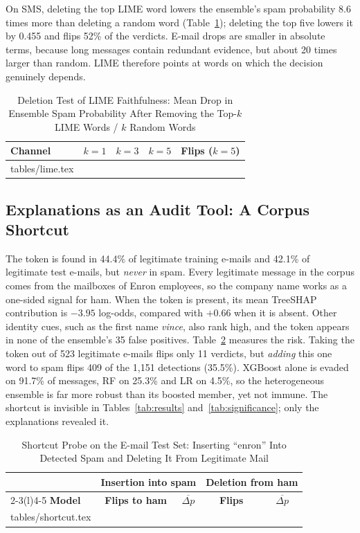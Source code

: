 \documentclass[conference]{IEEEtran}
\makeatletter
\newcommand{\inputtable}[1]{\@@input #1 }
\newcommand{\tok}[1]{\texttt{\detokenize{#1}}}
\makeatother
\begin{document}
On SMS, deleting the top LIME word lowers the ensemble's spam probability 8.6
times more than deleting a random word (Table~\ref{tab:lime}); deleting the
top five lowers it by 0.455 and flips 52\% of the verdicts. E-mail drops are
smaller in absolute terms, because long messages contain redundant evidence,
but about 20 times larger than random. LIME therefore points at words on
which the decision genuinely depends.

\begin{table}[!t]
\caption{Deletion Test of LIME Faithfulness: Mean Drop in Ensemble Spam Probability After Removing the Top-$k$ LIME Words / $k$ Random Words}
\label{tab:lime}
\centering
\footnotesize
\setlength{\tabcolsep}{2.4pt}
\begin{tabular}{@{}lcccc@{}}
\toprule
\textbf{Channel} & $k=1$ & $k=3$ & $k=5$ & \textbf{Flips} ($k{=}5$) \\
\midrule
\inputtable{tables/lime.tex}
\bottomrule
\end{tabular}
\end{table}

\subsection{Explanations as an Audit Tool: A Corpus Shortcut}

The token \tok{enron} is found in 44.4\% of legitimate training e-mails and
42.1\% of legitimate test e-mails, but \emph{never} in spam. Every legitimate message in the corpus comes from the mailboxes of Enron
employees, so the company name works as a
one-sided signal for ham. When the token is present, its mean TreeSHAP
contribution is $-3.95$ log-odds, compared with $+0.66$ when it is absent.
Other identity cues, such as the first name \emph{vince}, also rank high, and
the token appears in none of the ensemble's 35 false positives.
Table~\ref{tab:shortcut} measures the risk. Taking the token out of 523
legitimate e-mails flips only 11 verdicts, but \emph{adding} this one word to
spam flips 409 of the 1,151 detections (35.5\%).
XGBoost alone is evaded on
91.7\% of messages, RF on 25.3\% and LR on 4.5\%, so the heterogeneous ensemble
is far more robust than its boosted member, yet not immune. The shortcut is
invisible in Tables~\ref{tab:results} and~\ref{tab:significance}; only the
explanations revealed it.

\begin{table}[!t]
\caption{Shortcut Probe on the E-mail Test Set: Inserting ``enron'' Into Detected Spam and Deleting It From Legitimate Mail}
\label{tab:shortcut}
\centering
\footnotesize
\setlength{\tabcolsep}{3.2pt}
\begin{tabular}{@{}lcccc@{}}
\toprule
 & \multicolumn{2}{c}{\textbf{Insertion into spam}} & \multicolumn{2}{c}{\textbf{Deletion from ham}} \\
\cmidrule(lr){2-3}\cmidrule(l){4-5}
\textbf{Model} & \textbf{Flips to ham} & $\overline{\Delta p}$ & \textbf{Flips} & $\overline{\Delta p}$ \\
\midrule
\inputtable{tables/shortcut.tex}
\bottomrule
\end{tabular}
\end{table}
\end{document}
